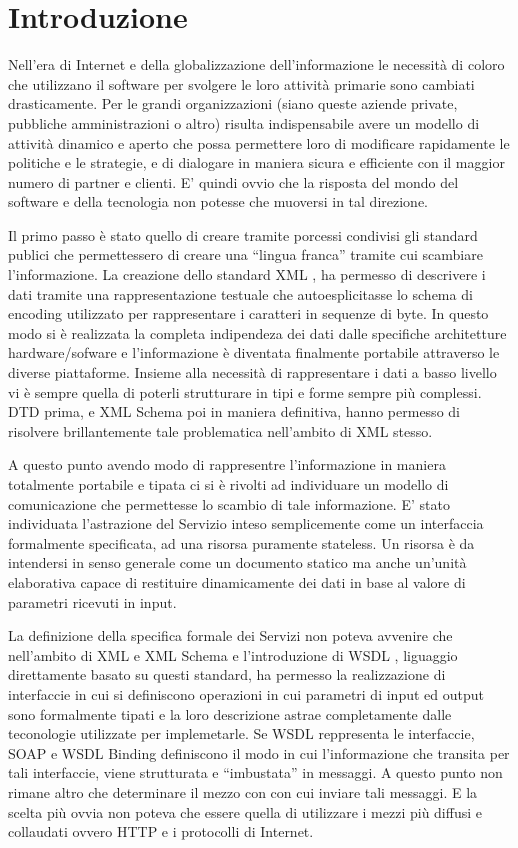 \chapter{Introduzione}

Nell'era di Internet e della globalizzazione dell'informazione le necessità di
coloro che utilizzano il software per svolgere le loro attività primarie sono
cambiati drasticamente. Per le grandi organizzazioni (siano queste aziende
private, pubbliche amministrazioni o altro) risulta indispensabile avere un
modello di attività dinamico e aperto che possa permettere loro di modificare
rapidamente le politiche e le strategie, e di dialogare in maniera sicura e
efficiente con il maggior numero di partner e clienti. E' quindi ovvio che la
risposta del mondo del software e della tecnologia non potesse che muoversi in
tal direzione. 

Il primo passo è stato quello di creare tramite porcessi condivisi gli standard
publici che permettessero di creare una ``lingua franca'' tramite cui scambiare
l'informazione. La creazione dello standard XML \cite{XML}, ha permesso di
descrivere i dati tramite una rappresentazione testuale che autoesplicitasse lo schema di
encoding utilizzato per rappresentare i caratteri in sequenze di byte. In questo
modo si è realizzata la completa indipendeza dei dati dalle specifiche
architetture hardware/sofware e l'informazione è diventata finalmente portabile
attraverso le diverse piattaforme. Insieme alla necessità di rappresentare i dati
a basso livello vi è sempre quella di poterli strutturare in tipi e forme sempre
più complessi. DTD prima, e XML Schema poi in maniera definitiva, hanno permesso
di risolvere brillantemente tale problematica nell'ambito di XML stesso.

A questo punto avendo modo di rappresentre l'informazione in maniera totalmente
portabile e tipata ci si è rivolti ad individuare un modello di
comunicazione che permettesse lo scambio di tale informazione. E' stato
individuata l'astrazione del Servizio inteso semplicemente come un interfaccia
formalmente specificata, ad una risorsa puramente stateless. Un risorsa è da
intendersi in senso generale come un documento statico ma anche un'unità
elaborativa capace di restituire dinamicamente dei dati in base al valore
di parametri ricevuti in input.

La definizione della specifica formale dei Servizi non poteva avvenire
che nell'ambito di XML e XML Schema e l'introduzione di WSDL \cite{WSDL}, liguaggio
direttamente basato su questi standard, ha permesso la realizzazione di
interfaccie in cui si definiscono operazioni in cui parametri di input ed output
sono formalmente tipati e la loro descrizione astrae completamente dalle
teconologie utilizzate per implemetarle. Se WSDL reppresenta le interfaccie,
SOAP \cite{SOAP} e WSDL Binding definiscono il modo in cui l'informazione che transita per tali interfaccie, viene strutturata e
``imbustata'' in messaggi. A questo punto non rimane altro che determinare il
mezzo con con cui inviare tali messaggi. E la scelta più ovvia non poteva che essere
quella di utilizzare i mezzi più diffusi e collaudati ovvero HTTP e i protocolli di
Internet.


